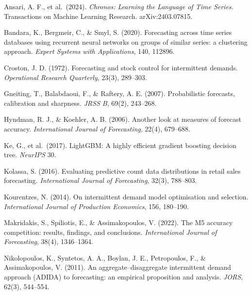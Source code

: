 \documentclass[11pt]{article}
\begin{document}
\begin{list}{}{%
  \setlength{\leftmargin}{1.5em}%
  \setlength{\itemindent}{-1.5em}%
  \setlength{\itemsep}{4pt}%
  \setlength{\parsep}{0pt}}

\item Ansari, A. F., et al.\ (2024). \emph{Chronos: Learning the Language of
Time Series.} Transactions on Machine Learning Research. arXiv:2403.07815.

\item Bandara, K., Bergmeir, C., \& Smyl, S. (2020). Forecasting across time
series databases using recurrent neural networks on groups of similar series: a
clustering approach. \emph{Expert Systems with Applications}, 140, 112896.

\item Croston, J. D. (1972). Forecasting and stock control for intermittent
demands. \emph{Operational Research Quarterly}, 23(3), 289--303.

\item Gneiting, T., Balabdaoui, F., \& Raftery, A. E. (2007). Probabilistic
forecasts, calibration and sharpness. \emph{JRSS B}, 69(2), 243--268.

\item Hyndman, R. J., \& Koehler, A. B. (2006). Another look at measures of
forecast accuracy. \emph{International Journal of Forecasting}, 22(4),
679--688.

\item Ke, G., et al.\ (2017). LightGBM: A highly efficient gradient boosting
decision tree. \emph{NeurIPS} 30.

\item Kolassa, S. (2016). Evaluating predictive count data distributions in
retail sales forecasting. \emph{International Journal of Forecasting}, 32(3),
788--803.

\item Kourentzes, N. (2014). On intermittent demand model optimisation and
selection. \emph{International Journal of Production Economics}, 156, 180--190.

\item Makridakis, S., Spiliotis, E., \& Assimakopoulos, V. (2022). The M5
accuracy competition: results, findings, and conclusions. \emph{International
Journal of Forecasting}, 38(4), 1346--1364.

\item Nikolopoulos, K., Syntetos, A. A., Boylan, J. E., Petropoulos, F., \&
Assimakopoulos, V. (2011). An aggregate--disaggregate intermittent demand
approach (ADIDA) to forecasting: an empirical proposition and analysis.
\emph{JORS}, 62(3), 544--554.


\end{list}
\end{document}
